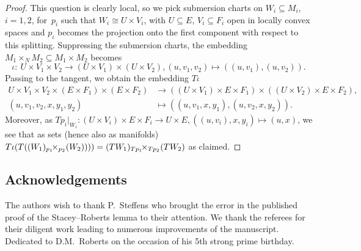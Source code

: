 \documentclass[pdftex]{sigma}
\numberwithin{equation}{section}
\begin{document}
\begin{proof}
This question is clearly local, so we pick submersion charts on $W_i \subseteq M_i$, $i=1,2$, for~$p_i$ such that $W_i \cong U \times V_i$, with $U\subseteq E$, $V_i \subseteq F_i$ open in locally convex spaces and $p_i$ becomes the projection onto the first component with respect to this splitting. Suppressing the submersion charts, the embedding $M_1\times_N M_2 \subseteq M_1 \times M_2$ becomes
\begin{displaymath}
 \iota \colon\ U \times V_1 \times V_2 \rightarrow (U\times V_1) \times (U \times V_2), (u,v_1,v_2) \mapsto ((u,v_1),(u,v_2)).
\end{displaymath}
Passing to the tangent, we obtain the embedding $T\iota$
\begin{align*}
 U \times V_1 \times V_2 \times (E \times F_1) \times (E\times F_2) &\rightarrow ((U\times V_1)\times E\times F_1)\times ((U\times V_2)\times E\times F_2),\\
 (u,v_1,v_2,x,y_1,y_2)&\mapsto ((u,v_1,x,y_1),(u,v_2,x,y_2) ).
\end{align*}
Moreover, as $Tp_i|_{W_i} \colon (U \times V_i) \times E \times F_i \rightarrow U\times E, ((u,v_i),x,y_i) \mapsto (u,x)$, we see that as sets (hence also as manifolds) $T\iota (T((W_1){}_{p_1}\hspace{-.4em}\times_{p_2} \hspace{-.2em} (W_2)) ) ) =(TW_1){}_{Tp_1}\hspace{-.4em}\times_{Tp_2}\hspace{-.2em}(TW_2)$ as claimed.
\end{proof}

\subsection*{Acknowledgements}

The authors wish to thank P.~Steffens who brought the error in the published proof of the Stacey--Roberts lemma to their attention. We thank the referees for their diligent work leading to numerous improvements of the manuscript. Dedicated to D.M.~Roberts on the occasion of his 5th strong prime birthday.
\end{document}
